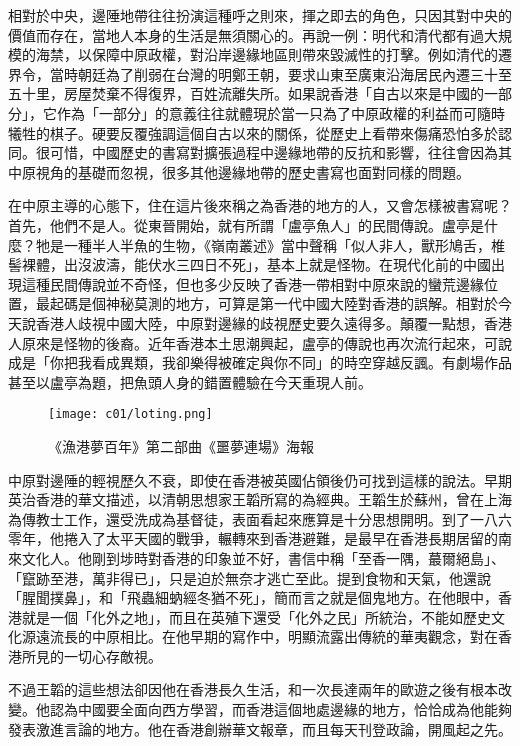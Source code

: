 相對於中央，邊陲地帶往往扮演這種呼之則來，揮之即去的角色，只因其對中央的價值而存在，當地人本身的生活是無須關心的。再說一例：明代和清代都有過大規模的海禁，以保障中原政權，對沿岸邊緣地區則帶來毀滅性的打擊。例如清代的遷界令，當時朝廷為了削弱在台灣的明鄭王朝，要求山東至廣東沿海居民內遷三十至五十里，房屋焚棄不得復界，百姓流離失所。如果說香港「自古以來是中國的一部分」，它作為「一部分」的意義往往就體現於當一只為了中原政權的利益而可隨時犧牲的棋子。硬要反覆強調這個自古以來的關係，從歷史上看帶來傷痛恐怕多於認同。很可惜，中國歷史的書寫對擴張過程中邊緣地帶的反抗和影響，往往會因為其中原視角的基礎而忽視，很多其他邊緣地帶的歷史書寫也面對同樣的問題。

在中原主導的心態下，住在這片後來稱之為香港的地方的人，又會怎樣被書寫呢？首先，他們不是人。從東晉開始，就有所謂「盧亭魚人」的民間傳說。盧亭是什麼？牠是一種半人半魚的生物，《嶺南叢述》當中聲稱「似人非人，獸形鳩舌，椎髻裸體，出沒波濤，能伏水三四日不死」，基本上就是怪物。在現代化前的中國出現這種民間傳說並不奇怪，但也多少反映了香港一帶相對中原來說的蠻荒邊緣位置，最起碼是個神秘莫測的地方，可算是第一代中國大陸對香港的誤解。相對於今天說香港人歧視中國大陸，中原對邊緣的歧視歷史要久遠得多。顛覆一點想，香港人原來是怪物的後裔。近年香港本土思潮興起，盧亭的傳說也再次流行起來，可說成是「你把我看成異類，我卻樂得被確定與你不同」的時空穿越反諷。有劇場作品甚至以盧亭為題，把魚頭人身的錯置體驗在今天重現人前。

\begin{figure}[htbp]
    \centering
    \texttt{[image: c01/loting.png]}

    \caption{《漁港夢百年》第二部曲《噩夢連場》海報} 
\end{figure}

中原對邊陲的輕視歷久不衰，即使在香港被英國佔領後仍可找到這樣的說法。早期英治香港的華文描述，以清朝思想家王韜所寫的為經典。王韜生於蘇州，曾在上海為傳教士工作，還受洗成為基督徒，表面看起來應算是十分思想開明。到了一八六零年，他捲入了太平天國的戰爭，輾轉來到香港避難，是最早在香港長期居留的南來文化人。他剛到埗時對香港的印象並不好，書信中稱「至香一隅，蕞爾絕島」、「竄跡至港，萬非得已」，只是迫於無奈才逃亡至此。提到食物和天氣，他還說「腥聞撲鼻」，和「飛蟲細蚋經冬猶不死」，簡而言之就是個鬼地方。在他眼中，香港就是一個「化外之地」，而且在英殖下還受「化外之民」所統治，不能如歷史文化源遠流長的中原相比。在他早期的寫作中，明顯流露出傳統的華夷觀念，對在香港所見的一切心存敵視。

不過王韜的這些想法卻因他在香港長久生活，和一次長達兩年的歐遊之後有根本改變。他認為中國要全面向西方學習，而香港這個地處邊緣的地方，恰恰成為他能夠發表激進言論的地方。他在香港創辦華文報章，而且每天刊登政論，開風起之先。

